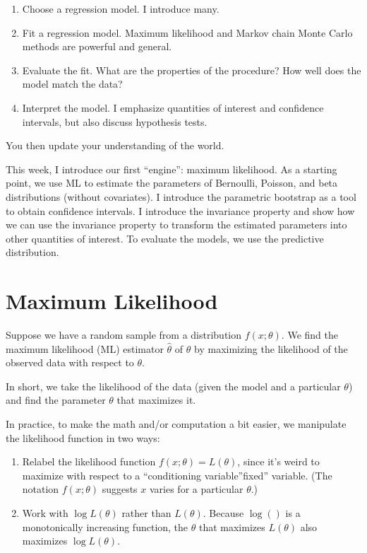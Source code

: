 \documentclass[
]{book}
\providecommand{\tightlist}{%
  \setlength{\itemsep}{0pt}\setlength{\parskip}{0pt}}
\begin{document}
\begin{enumerate}
\def\labelenumi{\arabic{enumi}.}
\tightlist
\item
  Choose a regression model. I introduce many.
\item
  Fit a regression model. Maximum likelihood and Markov chain Monte
  Carlo methods are powerful and general.
\item
  Evaluate the fit. What are the properties of the procedure? How well
  does the model match the data?
\item
  Interpret the model. I emphasize quantities of interest and confidence
  intervals, but also discuss hypothesis tests.
\end{enumerate}

You then update your understanding of the world.

This week, I introduce our first ``engine'': maximum likelihood. As a
starting point, we use ML to estimate the parameters of Bernoulli,
Poisson, and beta distributions (without covariates). I introduce the
parametric bootstrap as a tool to obtain confidence intervals. I
introduce the invariance property and show how we can use the invariance
property to transform the estimated parameters into other quantities of
interest. To evaluate the models, we use the predictive distribution.

\hypertarget{maximum-likelihood}{%
\section{Maximum Likelihood}\label{maximum-likelihood}}

Suppose we have a random sample from a distribution \(f(x; \theta)\). We
find the maximum likelihood (ML) estimator \(\hat{\theta}\) of
\(\theta\) by maximizing the likelihood of the observed data with
respect to \(\theta\).

In short, we take the likelihood of the data (given the model and a
particular \(\theta\)) and find the parameter \(\theta\) that maximizes
it.

In practice, to make the math and/or computation a bit easier, we
manipulate the likelihood function in two ways:

\begin{enumerate}
\def\labelenumi{\arabic{enumi}.}
\tightlist
\item
  Relabel the likelihood function \(f(x; \theta) = L(\theta)\), since
  it's weird to maximize with respect to a ``conditioning
  variable''fixed'' variable. (The notation \(f(x; \theta)\) suggests
  \(x\) varies for a particular \(\theta\).)
\item
  Work with \(\log L(\theta)\) rather than \(L(\theta)\). Because
  \(\log()\) is a monotonically increasing function, the \(\theta\) that
  maximizes \(L(\theta)\) also maximizes \(\log L(\theta)\).
\end{enumerate}
\end{document}

